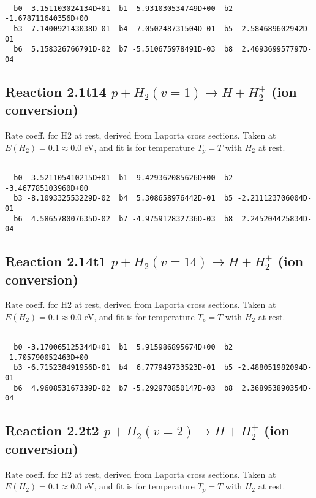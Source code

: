 \begin{small}\begin{verbatim}

  b0 -3.151103024134D+01  b1  5.931030534749D+00  b2 -1.678711640356D+00
  b3 -7.140092143038D-01  b4  7.050248731504D-01  b5 -2.584689602942D-01
  b6  5.158326766791D-02  b7 -5.510675978491D-03  b8  2.469369957797D-04

\end{verbatim}\end{small}

\newpage
\subsection{
Reaction 2.1t14
$ p + H_2(v=1) \rightarrow H + H_2^+$ (ion conversion)
}
Rate coeff. for H2 at rest, derived from Laporta cross sections.
Taken at $E(H_2) = 0.1 \approx 0.0$ eV,  and fit is for temperature $T_p=T$ with $H_2$ at rest.

\begin{small}\begin{verbatim}

  b0 -3.521105410215D+01  b1  9.429362085626D+00  b2 -3.467785103960D+00
  b3 -8.109332553229D-02  b4  5.308658976442D-01  b5 -2.211123706004D-01
  b6  4.586578007635D-02  b7 -4.975912832736D-03  b8  2.245204425834D-04

\end{verbatim}\end{small}

\newpage
\subsection{
Reaction 2.14t1
$ p + H_2(v=14) \rightarrow H + H_2^+$ (ion conversion)
}
Rate coeff. for H2 at rest, derived from Laporta cross sections.
Taken at $E(H_2) = 0.1 \approx 0.0$ eV,  and fit is for temperature $T_p=T$ with $H_2$ at rest.

\begin{small}\begin{verbatim}

  b0 -3.170065125344D+01  b1  5.915986895674D+00  b2 -1.705790052463D+00
  b3 -6.715238491956D-01  b4  6.777949733523D-01  b5 -2.488051982094D-01
  b6  4.960853167339D-02  b7 -5.292970850147D-03  b8  2.368953890354D-04

\end{verbatim}\end{small}

\newpage
\subsection{
Reaction 2.2t2
$ p + H_2(v=2) \rightarrow H + H_2^+$ (ion conversion)
}
Rate coeff. for H2 at rest, derived from Laporta cross sections.
Taken at $E(H_2) = 0.1 \approx 0.0$ eV,  and fit is for temperature $T_p=T$ with $H_2$ at rest.

